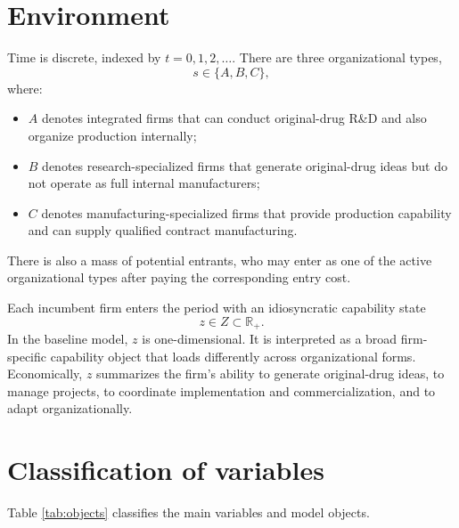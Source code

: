 \documentclass[12pt,fontset=none]{ctexart}
\begin{document}
\section{Environment}

Time is discrete, indexed by $t=0,1,2,\dots$. There are three organizational types,
\[
s\in\{A,B,C\},
\]
where:

\begin{itemize}[leftmargin=2em]
    \item $A$ denotes integrated firms that can conduct original-drug R\&D and also
    organize production internally;
    \item $B$ denotes research-specialized firms that generate original-drug ideas but
    do not operate as full internal manufacturers;
    \item $C$ denotes manufacturing-specialized firms that provide production capability
    and can supply qualified contract manufacturing.
\end{itemize}

There is also a mass of potential entrants, who may enter as one of the active organizational
types after paying the corresponding entry cost.

Each incumbent firm enters the period with an idiosyncratic capability state
\[
z\in Z\subset \mathbb{R}_+.
\]
In the baseline model, $z$ is one-dimensional. It is interpreted as a broad firm-specific
capability object that loads differently across organizational forms. Economically, $z$
summarizes the firm's ability to generate original-drug ideas, to manage projects,
to coordinate implementation and commercialization, and to adapt organizationally.

\section{Classification of variables}

Table \ref{tab:objects} classifies the main variables and model objects.
\end{document}
